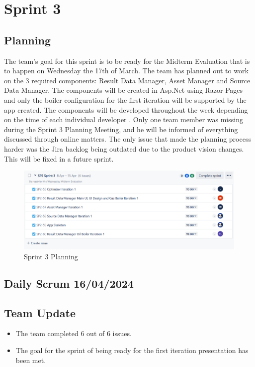 \documentclass[12pt]{report}
\begin{document}
\section{Sprint 3}
\subsection*{Planning}
The team's goal for this sprint is to be ready for the Midterm Evaluation that is to happen on
Wednesday the 17th of March. The team has planned out to work on the 3 required components:
Result Data Manager, Asset Manager and Source Data Manager. The components will be created in
Asp.Net using Razor Pages and only the boiler configuration for the first iteration will be supported
by the app created. The components will be developed throughout the week depending on the time
of each individual developer . Only one team member was missing during the Sprint 3 Planning
Meeting, and he will be informed of everything discussed through online matters. The only issue that
made the planning process harder was the Jira backlog being outdated due to the product vision
changes. This will be fixed in a future sprint.

\begin{figure}[H]
  \centering
  \includegraphics[width=1\textwidth]{Resources/3-Sprint/Planning/Sprint3Planning.png}
  \caption{Sprint 3 Planning}
  \label{fig:S3Planning-image}
\end{figure}
\clearpage

\subsection*{Daily Scrum 16/04/2024}
\subsection*{Team Update}
\begin{itemize}
    \item The team completed 6 out of 6 issues.
    \item The goal for the sprint of being ready for the first iteration presentation has been met.
\end{itemize}
\end{document}
